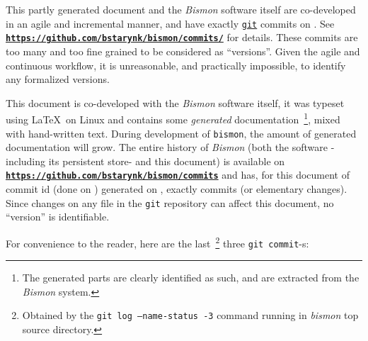 \documentclass[11pt,a4paper,svgnames]{article}
\newcommand{\bmurl}[1]{{\href{#1}{\texttt{\textbf{#1}}}}}
\begin{document}
\begin{titlepage}
  \medskip
  
  
This partly generated document and the \emph{Bismon} software itself
are co-developed in an agile and incremental manner, and have exactly {\bmgitnumbercommits} \href{http://git-scm.com/}{\texttt{git}}
commits on \textit{\bmdoctimestamp}. See
\bmurl{https://github.com/bstarynk/bismon/commits/} for details. These commits are too many and too fine grained to be considered as ``versions''. Given the agile and continuous workflow, it is unreasonable, and practically impossible, to identify any formalized versions.

\begin{relsize}{-0.5}
This document is co-developed with the \emph{Bismon} software itself,
it was typeset using \LaTeX~on Linux and contains some \emph{generated}
documentation~\footnote{The generated parts are clearly identified as
  such, and are extracted from the \emph{Bismon} system.}, mixed with
hand-written text. During development of \texttt{bismon}, the amount
of generated documentation will grow.  The entire history of
\emph{Bismon} (both the software -including its persistent store- and
this document) is available on
\bmurl{https://github.com/bstarynk/bismon/commits} and has, for this
document of commit id \texttt{\bmgitcommit} (done on \emph{\bmgitdate}) generated on
\textit{\bmdocdate}, exactly {\bmgitnumbercommits} commits (or
elementary changes). Since changes on any file in the \texttt{git}
repository can affect this document, no ``version'' is identifiable.
\end{relsize}
\bigskip

For convenience to the reader, here are the last~\footnote{Obtained by the
  \texttt{git log --name-status -3} command running in \emph{bismon}
  top source directory.} three \texttt{git commit}-s:

\begin{relsize}{-2}
  
\end{relsize}


\end{titlepage}
\end{document}
